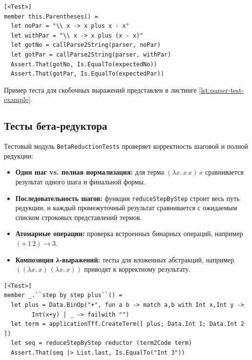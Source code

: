 \begin{itemize}
\begin{lstlisting}[float=tb,frame=lines,label=lst:parser-test-example,caption={Пример теста для скобочных выражений}]
[<Test>]
member this.Parentheses() =
  let noPar = "\\ x -> x plus x - x"
  let withPar = "\\ x -> x plus (x - x)"
  let gotNo = callParse2String(parser, noPar)
  let gotPar = callParse2String(parser, withPar)
  Assert.That(gotNo, Is.EqualTo(expectedNo))
  Assert.That(gotPar, Is.EqualTo(expectedPar))
\end{lstlisting}

Пример теста для скобочных выражений представлен в листинге \ref{lst:parser-test-example}.

\subsection{Тесты бета‑редуктора}

Тестовый модуль \texttt{BetaReductionTests} проверяет корректность шаговой и полной редукции:

\begin{itemize}
  \item \textbf{Один шаг vs. полная нормализация:} для терма \((\lambda x.\,x\,x)\,x\) сравнивается результат одного шага и финальной формы.  
  \item \textbf{Последовательность шагов:} функция \texttt{reduceStepByStep} строит весь путь редукции, и каждый промежуточный результат сравнивается с ожидаемым списком строковых представлений термов.  
  \item \textbf{Атомарные операции:} проверка встроенных бинарных операций, например \((+\,1\,2)\to 3\).  
  \item \textbf{Композиция λ‑выражений:} тесты для вложенных абстракций, например \(((\lambda x.\,x)\,(\lambda x.\,x))\) приводят к корректному результату.  
\end{itemize}

\begin{lstlisting}[float=tb,frame=lines,label=lst:reductor-step-test,caption={Проверка последовательности шагов редукции}]
[<Test>]
member _.``step by step plus``() =
  let plus = Data.BinOp("+", fun a b -> match a,b with Int x,Int y -> 
        Int(x+y) | _ -> failwith "")
  let term = applicationTff.CreateTerm([ plus; Data.Int 1; Data.Int 2 ])
  let seq = reduceStepByStep reductor (term2Code term)
  Assert.That(seq |> List.last, Is.EqualTo("Int 3"))
\end{lstlisting}


\end{itemize}
